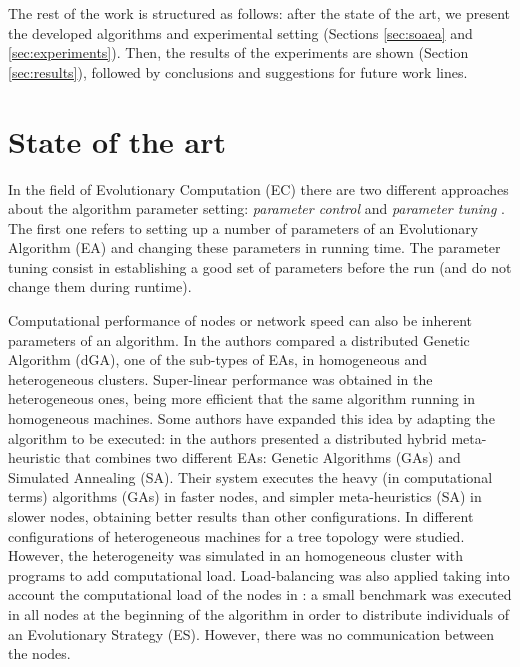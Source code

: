 The rest of the work is structured as follows: after the state of
the art, we present the developed algorithms and experimental setting (Sections \ref{sec:soaea} and \ref{sec:experiments}). 
Then, the results of the experiments are shown (Section \ref{sec:results}), followed by conclusions and suggestions for future work lines.


%
\section{State of the art}
\label{sec:soa}
%

In the field of  Evolutionary Computation (EC) there are two different approaches about the algorithm parameter setting: {\em parameter control} and {\em parameter tuning} \cite{PARAMETERTUNING}. The first one refers to setting up a number of parameters of an Evolutionary Algorithm (EA) and changing these parameters in running time. The parameter tuning consist in establishing a good set of parameters before the run (and do not change them during runtime).

 Computational performance of nodes or network speed can also be inherent parameters of an algorithm. In \cite{HETEROGENEOUSHARD} the authors compared a distributed Genetic Algorithm (dGA), one of the sub-types of EAs, in homogeneous and heterogeneous clusters. Super-linear performance was obtained in the heterogeneous ones, being more efficient that the same algorithm running in homogeneous machines. Some authors have expanded this idea by adapting the algorithm to be executed: in \cite{HYDROCM} the authors presented a distributed hybrid meta-heuristic that combines two different EAs: Genetic Algorithms (GAs) and Simulated Annealing (SA). Their system executes the heavy (in computational terms) algorithms (GAs) in faster nodes, and simpler meta-heuristics (SA) in slower nodes, obtaining better results than other configurations. In \cite{HETEROGENEOUSTOPOLOGY} different configurations of heterogeneous machines for a tree topology were studied. However, the heterogeneity was simulated in an homogeneous cluster with programs to add computational load. Load-balancing was also applied taking into account the computational load of the nodes in \cite{PARALLELIMPLEMENTATION}: a small benchmark was executed in all nodes at the beginning of the algorithm in order to distribute individuals of an Evolutionary Strategy (ES). However, there was no communication between the nodes. 

